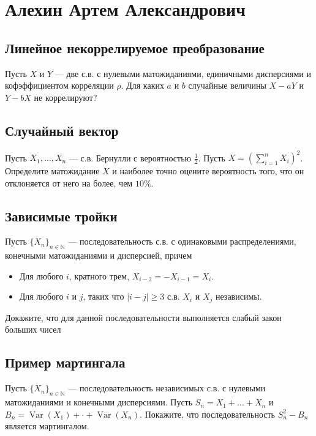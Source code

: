 \documentclass[12pt]{article}
\newcommand\N{\mathbb{N}}
\DeclareMathOperator{\Var}{Var}
\begin{document}

\section{Алехин Артем Александрович}

\subsection{Линейное некоррелируемое преобразование}

Пусть $X$ и $Y$ --- две с.в. с нулевыми матожиданиями, единичными дисперсиями и кофэффициентом корреляции $\rho$. Для каких $a$ и $b$ случайные величины $X - aY$ и $Y - bX$ не коррелируют?


\subsection{Случайный вектор}

Пусть $X_1, \dots, X_n$ --- с.в. Бернулли с вероятностью $\frac{1}{2}$. Пусть $X = (\sum_{i = 1}^n X_i)^2$. Определите матожидание $X$ и наиболее точно оцените вероятность того, что он отклоняется от него на более, чем $10\%$.


\subsection{Зависимые тройки}
Пусть $\{X_n\}_{n \in \N}$ --- последовательность с.в. с одинаковыми распределениями, конечными матожиданиями и дисперсией, причем
\begin{itemize}
    \item Для любого $i$, кратного трем, $X_{i - 2} = - X_{i - 1} = X_{i}$. 
    \item Для любого $i$ и $j$, таких что $|i - j| \ge 3$ с.в. $X_i$ и $X_j$ независимы.
\end{itemize}
Докажите, что для данной последовательности выполняется слабый закон больших чисел


\subsection{Пример мартингала}

Пусть $\{X_n\}_{n \in \N}$ --- последовательность независимых с.в. с нулевыми матожиданиями и конечными дисперсиями. Пусть $S_n = X_1 + \dots + X_n$ и $B_n = \Var(X_1) + \cdot + \Var(X_n)$. Покажите, что последовательность $S_n^2 - B_n$ является мартингалом.
\end{document}
